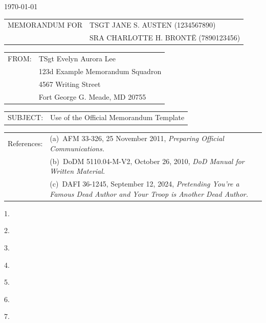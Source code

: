 \documentclass[12pt]{article}
\newlength{\extraSpaceLength}
\newcommand{\setcolumnwidth}[2]{
    \newlength{#1}%
    \settowidth{#1}{#2}%
    \addtolength{#1}{\extraSpaceLength} %
}
\begin{document}
\pagestyle{default}
\thispagestyle{firstpage}


\noindent\hfill\monthyeardate\today


\setcolumnwidth{\memoWidth}{MEMORANDUM FOR}
\noindent
\begin{tabularx}{\textwidth}{@{} p{\memoWidth} @{} X @{}} 
MEMORANDUM FOR & TSGT JANE S. AUSTEN (1234567890)\\
               & SRA CHARLOTTE H. BRONTË (7890123456)\\
\end{tabularx}

\setcolumnwidth{\fromWidth}{FROM:}
\noindent
\begin{tabularx}{\textwidth}{@{} p{\fromWidth} @{} X @{}} 
FROM: & TSgt Evelyn Aurora Lee\\
      & 123d Example Memorandum Squadron\\
      & 4567 Writing Street\\
      & Fort George G. Meade, MD 20755\\
\end{tabularx}

\setcolumnwidth{\subjectWidth}{SUBJECT:}
\noindent
\begin{tabularx}{\textwidth}{@{} p{\subjectWidth} @{} X @{}} 
SUBJECT: & Use of the Official Memorandum Template\\
\end{tabularx}

\setcolumnwidth{\referencesWidth}{References:}
\noindent
\begin{tabularx}{\textwidth}{@{} p{} @{} X @{}} 
References: & (a)~AFM 33-326, 25 November 2011, \textit{Preparing Official Communications.}\\
            & (b)~DoDM 5110.04-M-V2, October 26, 2010, \textit{DoD Manual for Written Material.}\\
            & (c)~DAFI 36-1245, September 12, 2024, \textit{Pretending You're a Famous Dead Author and Your Troop is Another Dead Author.}\\
\end{tabularx}

1.~\lipsum[1]

2.~\lipsum[1]

3.~\lipsum[1]

4.~\lipsum[1]

5.~\lipsum[1]

6.~\lipsum[1]

7.~\lipsum[1]

\end{document}
